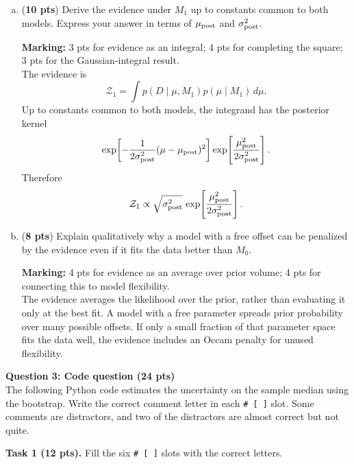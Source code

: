 \documentclass{article}
\newcommand{\givesolutions}{true}
\newcommand{\answer}[2]{%
\ifthenelse{\equal{#2}{true}}%
{{\color{blue}#1}}%
{}%
}
\newenvironment{ansbox}[1]{%
  \begin{lrbox}{\mybox}\begin{minipage}[t][#1]{\linewidth}%
}{%
  \vfill\hfill\end{minipage}\end{lrbox}\fbox{\usebox{\mybox}}%
}
\begin{document}
\begin{enumerate}[(a)]
    \item ({\bf 10 pts}) Derive the evidence under $M_1$ up to constants common to both models. Express your answer in terms of $\mu_{\rm post}$ and $\sigma_{\rm post}^2$. \\
    \begin{ansbox}{2.6in}
    \answer{\textbf{Marking:} 3 pts for evidence as an integral; 4 pts for completing the square; 3 pts for the Gaussian-integral result.\\The evidence is
    \[
    \mathcal Z_1=\int p(D\mid\mu,M_1)p(\mu\mid M_1)\,d\mu.
    \]
    Up to constants common to both models, the integrand has the posterior kernel
    \[
    \exp\!\left[-\frac{1}{2\sigma_{\rm post}^2}(\mu-\mu_{\rm post})^2\right]
    \exp\!\left[\frac{\mu_{\rm post}^2}{2\sigma_{\rm post}^2}\right].
    \]
    Therefore
    \[
    \mathcal Z_1\propto \sqrt{\sigma_{\rm post}^2}\,
    \exp\!\left[\frac{\mu_{\rm post}^2}{2\sigma_{\rm post}^2}\right].
    \]}{\givesolutions}
    \end{ansbox}

    \item ({\bf 8 pts}) Explain qualitatively why a model with a free offset can be penalized by the evidence even if it fits the data better than $M_0$. \\
    \begin{ansbox}{1.6in}
    \answer{\textbf{Marking:} 4 pts for evidence as an average over prior volume; 4 pts for connecting this to model flexibility.\\The evidence averages the likelihood over the prior, rather than evaluating it only at the best fit. A model with a free parameter spreads prior probability over many possible offsets. If only a small fraction of that parameter space fits the data well, the evidence includes an Occam penalty for unused flexibility.}{\givesolutions}
    \end{ansbox}
\end{enumerate}

\newpage

\noindent\large{{\bf{Question 3: Code question (24 pts)}}}\\

The following Python code estimates the uncertainty on the sample median using the bootstrap.
Write the correct comment letter in each \verb|# [ ]| slot.
Some comments are distractors, and two of the distractors are almost correct but not quite.

\textbf{Task 1 (12 pts).} Fill the six \verb|# [ ]| slots with the correct letters. \\
\end{document}
